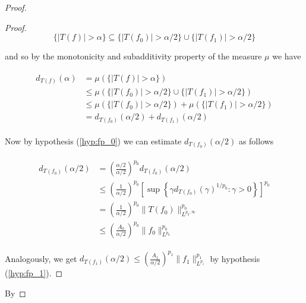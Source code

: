 \begin{proof}
\begin{proof}
\begin{equation*}
	\{\vert T(f)\vert > \alpha \} \subseteq \{\vert T(f_0) \vert > \alpha/2 \} \cup \{\vert T(f_1) \vert > \alpha/2 \}
\end{equation*}

and so by the monotonicity and subadditivity property of the measure $\mu$ we have

\begin{gather}
	\begin{aligned}
	d_{T(f)}(\alpha) &= \mu(\{\vert T(f)\vert > \alpha\})\\
	&\leqslant \mu(\{\vert T(f_0)\vert > \alpha/2 \} \cup \{\vert T(f_1)\vert > \alpha/2 \})\\
	&\leqslant \mu(\{\vert T(f_0) \vert > \alpha/2 \}) + \mu(\{\vert T(f_1)\vert > \alpha/2 \})\\
	&= d_{T(f_0)}(\alpha/2) + d_{T(f_1)}(\alpha/2)
	\label{est:T}
	\end{aligned}
\end{gather}

Now by hypothesis (\ref{hyp:fp_0}) we can estimate $d_{T(f_0)}(\alpha/2)$ as follows

\begin{gather}
	\begin{aligned}
		d_{T(f_0)}(\alpha/2) &= \left(\frac{\alpha/2}{\alpha/2}\right)^{p_0} d_{T(f_0)}(\alpha/2)\\
		&\leqslant \left(\frac{1}{\alpha/2}\right)^{p_0} \left[\sup\left\{ \gamma d_{T(f_0)}(\gamma)^{1/p_0}: \gamma > 0\right\}\right]^{p_0}\\
	 & = \left(\frac{1}{\alpha/2}\right)^{p_0} \|T(f_0)\|^{p_0}_{L^{p_0,\infty}}\\
	 & \leqslant \left(\frac{A_0}{\alpha/2}\right)^{p_0} \|f_0\|^{p_0}_{L^{p_0}}
	\label{est:p_0}
	\end{aligned}
\end{gather}

Analogously, we get  $d_{T(f_1)}(\alpha/2) \leqslant \left(\frac{A_1}{\alpha/2}\right)^{p_1} \|f_1\|^{p_1}_{L^{p_1}}\label{est:p_1}$ by hypothesis (\ref{hyp:fp_1}).
\end{proof}

By


\end{proof}
